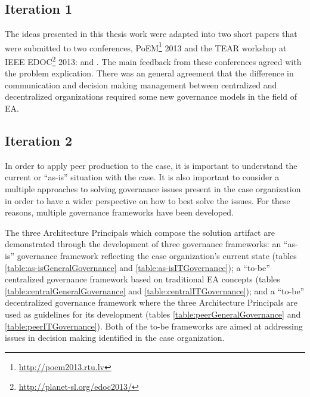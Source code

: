 \subsection{Iteration 1}

The ideas presented in this thesis work were adapted into two short papers that were submitted to two conferences, PoEM\footnote{\url{http://poem2013.rtu.lv}} 2013 and the TEAR workshop at IEEE EDOC\footnote{\url{http://planet-sl.org/edoc2013/}} 2013: \cite{speckert2013} and \cite{rychkova2013}. The main feedback from these conferences agreed with the problem explication. There was an general agreement that the difference in communication and decision making management between centralized and decentralized organizations required some new governance models in the field of EA. 

%

\subsection{Iteration 2}

In order to apply peer production to the case, it is important to understand the current or ``as-is'' situation with the case. It is also important to consider a multiple approaches to solving governance issues present in the case organization in order to have a wider perspective on how to best solve the issues.  For these reasons, multiple governance frameworks have been developed.

The three Architecture Principals which compose the solution artifact are demonstrated through the development of three governance frameworks: an ``as-is'' governance framework reflecting the case organization's current state (tables \ref{table:as-isGeneralGovernance} and \ref{table:as-isITGovernance}); a ``to-be'' centralized governance framework based on traditional EA concepts (tables \ref{table:centralGeneralGovernance} and \ref{table:centralITGovernance}); and a ``to-be'' decentralized governance framework where the three Architecture Principals are used as guidelines for its development (tables \ref{table:peerGeneralGovernance} and \ref{table:peerITGovernance}). Both of the to-be frameworks are aimed at addressing issues in decision making identified in the case organization. 

